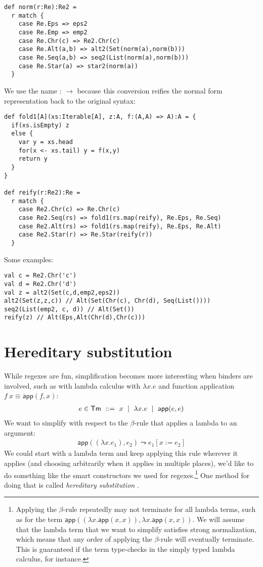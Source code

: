 \begin{lstlisting}
def norm(r:Re):Re2 =
  r match {
    case Re.Eps => eps2
    case Re.Emp => emp2
    case Re.Chr(c) => Re2.Chr(c)
    case Re.Alt(a,b) => alt2(Set(norm(a),norm(b)))
    case Re.Seq(a,b) => seq2(List(norm(a),norm(b)))
    case Re.Star(a) => star2(norm(a))
  }
\end{lstlisting}

We use the name  :  $\to$  because this conversion reifies the normal form representation back to the original syntax:

\begin{lstlisting}
def fold1[A](xs:Iterable[A], z:A, f:(A,A) => A):A = {
  if(xs.isEmpty) z
  else {
    var y = xs.head
    for(x <- xs.tail) y = f(x,y)
    return y
  }
}

def reify(r:Re2):Re =
  r match {
    case Re2.Chr(c) => Re.Chr(c)
    case Re2.Seq(rs) => fold1(rs.map(reify), Re.Eps, Re.Seq)
    case Re2.Alt(rs) => fold1(rs.map(reify), Re.Eps, Re.Alt)
    case Re2.Star(r) => Re.Star(reify(r))
  }
\end{lstlisting}

Some examples:

\begin{lstlisting}
val c = Re2.Chr('c')
val d = Re2.Chr('d')
val z = alt2(Set(c,d,emp2,eps2))
alt2(Set(z,z,c)) // Alt(Set(Chr(c), Chr(d), Seq(List())))
seq2(List(emp2, c, d)) // Alt(Set())
reify(z) // Alt(Eps,Alt(Chr(d),Chr(c)))
\end{lstlisting}


\section{Hereditary substitution}

\newcommand{\ap}{\mathsf{app}}
\newcommand{\steps}{\leadsto}

While regexes are fun, simplification becomes more interesting when binders are involved, such as with lambda calculus with $\lambda x. e$ and function application $f\ x \equiv \ap(f,x)$:
\begin{align*}
  e \in \mathsf{Tm} \ ::=\  x \md \lambda x. e \md \ap(e,e)
\end{align*}
We want to simplify with respect to the $\beta$-rule that applies a lambda to an argument:
\begin{align*}
  \ap((\lambda x. e_1), e_2) \steps e_1[x := e_2]
\end{align*}
We could start with a lambda term and keep applying this rule wherever it applies (and choosing arbitrarily when it applies in multiple places), we'd like to do something like the smart constructors we used for regexes.\footnote{Applying the $\beta$-rule repeatedly may not terminate for all lambda terms, such as for the term $\ap((\lambda x. \ap(x,x)), \lambda x. \ap(x,x))$. We will assume that the lambda term that we want to simplify satisfies strong normalization, which means that any order of applying the $\beta$-rule will eventually terminate. This is guaranteed if the term type-checks in the simply typed lambda calculus, for instance.}
One method for doing that is called \emph{hereditary substitution} \cite{keller:inria-00520606}.

